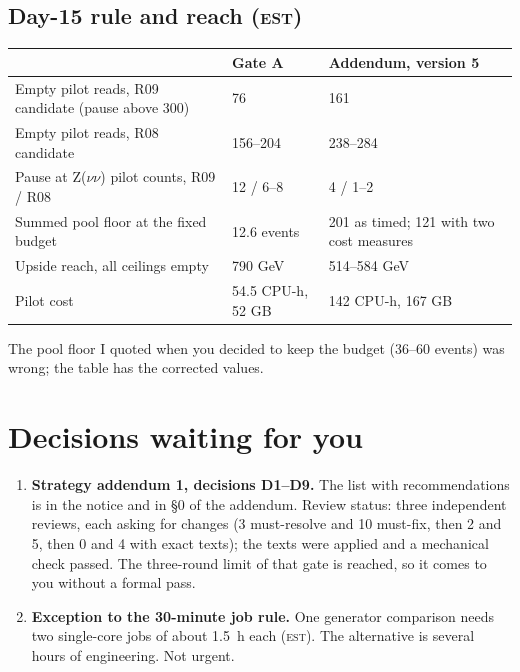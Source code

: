 \documentclass[11pt,a4paper]{article}
\newcommand{\est}{\textsc{est}}
\begin{document}
\subsection*{Day-15 rule and reach (\est)}
\begin{center}
\begin{tabular}{L{7.2cm}L{3.0cm}L{3.6cm}}
\toprule
 & Gate A & Addendum, version 5 \\
\midrule
Empty pilot reads, R09 candidate (pause above 300) & 76 & 161 \\
Empty pilot reads, R08 candidate & 156--204 & 238--284 \\
Pause at Z($\nu\nu$) pilot counts, R09 / R08 & 12 / 6--8 & 4 / 1--2 \\
Summed pool floor at the fixed budget & 12.6 events & 201 as timed; 121 with two cost measures \\
Upside reach, all ceilings empty & 790 GeV & 514--584 GeV \\
Pilot cost & 54.5 CPU-h, 52 GB & 142 CPU-h, 167 GB \\
\bottomrule
\end{tabular}
\end{center}
The pool floor I quoted when you decided to keep the budget (36--60 events) was wrong; the table has the corrected
values.

\section{Decisions waiting for you}\label{sec:dec}
\begin{enumerate}
\item \textbf{Strategy addendum 1, decisions D1--D9.} The list with recommendations is in the notice
       and in §0 of
      the addendum. Review status: three independent reviews, each asking for changes (3 must-resolve and 10
      must-fix, then 2 and 5, then 0 and 4 with exact texts); the texts were applied and a mechanical check
      passed. The three-round limit of that gate is reached, so it comes to you without a formal pass.
\item \textbf{Exception to the 30-minute job rule.} One generator comparison needs two single-core jobs of about
      1.5~h each (\est). The alternative is several hours of engineering. Not urgent.
\end{enumerate}
\end{document}

